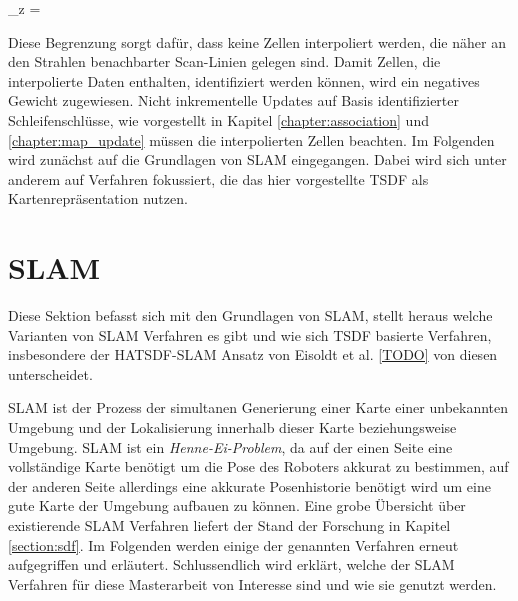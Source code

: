 \begin{myequation}
\Delta_z = 
\end{myequation}

Diese Begrenzung sorgt dafür, dass keine Zellen interpoliert werden, die näher an den Strahlen benachbarter Scan-Linien gelegen sind. Damit Zellen, die interpolierte Daten enthalten, identifiziert werden können, wird ein negatives Gewicht zugewiesen. Nicht inkrementelle Updates auf Basis identifizierter Schleifenschlüsse, wie vorgestellt in Kapitel \ref{chapter:association} und \ref{chapter:map_update} müssen die interpolierten Zellen beachten. Im Folgenden wird zunächst auf die Grundlagen von SLAM eingegangen. Dabei wird sich unter anderem auf Verfahren fokussiert, die das hier vorgestellte TSDF als Kartenrepräsentation nutzen.

\section{SLAM}
\label{section:slam}

Diese Sektion befasst sich mit den Grundlagen von SLAM, stellt heraus welche Varianten von SLAM Verfahren es gibt und wie sich TSDF basierte Verfahren, insbesondere der HATSDF-SLAM Ansatz von Eisoldt et al. \ref{TODO} von diesen unterscheidet.

SLAM ist der Prozess der simultanen Generierung einer Karte einer unbekannten Umgebung und der Lokalisierung innerhalb dieser Karte beziehungsweise Umgebung.
SLAM ist ein \emph{Henne-Ei-Problem}, da auf der einen Seite eine vollständige Karte benötigt um die Pose des Roboters akkurat zu bestimmen, auf der anderen Seite allerdings eine akkurate Posenhistorie benötigt wird um eine gute Karte der Umgebung aufbauen zu können.
Eine grobe Übersicht über existierende SLAM Verfahren liefert der Stand der Forschung in Kapitel \ref{section:sdf}.
Im Folgenden werden einige der genannten Verfahren erneut aufgegriffen und erläutert.
Schlussendlich wird erklärt, welche der SLAM Verfahren für diese Masterarbeit von Interesse sind und wie sie genutzt werden.

